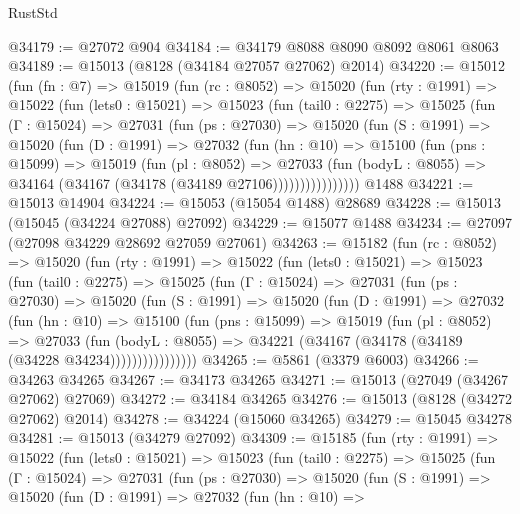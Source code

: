 \begin{lexlean}{RustStd}
\begin{coremodule}
@34179 := @27072 @904
@34184 := @34179 @8088 @8090 @8092 @8061 @8063
@34189 := @15013 (@8128 (@34184 @27057 @27062) @2014)
@34220 := @15012
    (fun (fn : @7) =>
    @15019
      (fun (rc : @8052) =>
      @15020
        (fun (rty : @1991) =>
        @15022
          (fun (lets0 : @15021) =>
          @15023
            (fun (tail0 : @2275) =>
            @15025
              (fun (Γ : @15024) =>
              @27031
                (fun (ps : @27030) =>
                @15020
                  (fun (S : @1991) =>
                  @15020
                    (fun (D : @1991) =>
                    @27032
                      (fun (hn : @10) =>
                      @15100
                        (fun (pns : @15099) =>
                        @15019
                          (fun (pl : @8052) =>
                          @27033
                            (fun (bodyL : @8055) =>
                            @34164 (@34167 (@34178 (@34189 @27106))))))))))))))))
    @1488
@34221 := @15013 @14904
@34224 := @15053 (@15054 @1488) @28689
@34228 := @15013 (@15045 (@34224 @27088) @27092)
@34229 := @15077 @1488
@34234 := @27097 (@27098 @34229 @28692 @27059 @27061)
@34263 := @15182
    (fun (rc : @8052) =>
    @15020
      (fun (rty : @1991) =>
      @15022
        (fun (lets0 : @15021) =>
        @15023
          (fun (tail0 : @2275) =>
          @15025
            (fun (Γ : @15024) =>
            @27031
              (fun (ps : @27030) =>
              @15020
                (fun (S : @1991) =>
                @15020
                  (fun (D : @1991) =>
                  @27032
                    (fun (hn : @10) =>
                    @15100
                      (fun (pns : @15099) =>
                      @15019
                        (fun (pl : @8052) =>
                        @27033
                          (fun (bodyL : @8055) =>
                          @34221 (@34167 (@34178 (@34189 (@34228 @34234))))))))))))))))
@34265 := @5861 (@3379 @6003)
@34266 := @34263 @34265
@34267 := @34173 @34265
@34271 := @15013 (@27049 (@34267 @27062) @27069)
@34272 := @34184 @34265
@34276 := @15013 (@8128 (@34272 @27062) @2014)
@34278 := @34224 (@15060 @34265)
@34279 := @15045 @34278
@34281 := @15013 (@34279 @27092)
@34309 := @15185
    (fun (rty : @1991) =>
    @15022
      (fun (lets0 : @15021) =>
      @15023
        (fun (tail0 : @2275) =>
        @15025
          (fun (Γ : @15024) =>
          @27031
            (fun (ps : @27030) =>
            @15020
              (fun (S : @1991) =>
              @15020
                (fun (D : @1991) =>
                @27032
                  (fun (hn : @10) =>

\end{coremodule}
\end{lexlean}
